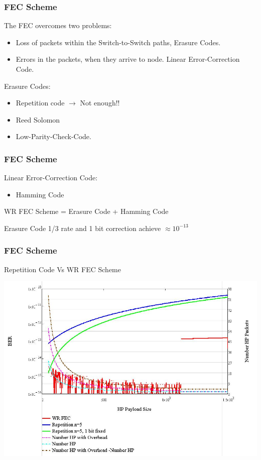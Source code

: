 \documentclass[]{beamer}
\begin{document}
\begin{frame}
\frametitle{FEC Scheme}
The FEC overcomes two problems:
\begin{itemize}
	\item Loss of packets within the Switch-to-Switch paths, Erasure Codes.
	\item Errors in the packets, when they arrive to node. Linear Error-Correction Code.
\end{itemize}


Erasure Codes: 
\begin{itemize}
	\item Repetition code $\rightarrow$ Not enough!! 
	\item Reed Solomon 
	\item Low-Parity-Check-Code.
\end{itemize}
\end{frame}

\begin{frame}
\frametitle{FEC Scheme}
Linear Error-Correction Code:
\begin{itemize}
	\item Hamming Code
\end{itemize}

\vspace{0.5cm}
\begin{center}
WR FEC Scheme = Erasure Code + Hamming Code

Erasure Code  1/3 rate and 1 bit correction achieve $\approx 10^{-13}$   

\end{center}
\end{frame}




\begin{frame}
\frametitle{FEC Scheme}
Repetition Code Vs WR FEC Scheme
\begin{center}

  \includegraphics[scale=0.35]{robustness/biterror}



\end{center}
\end{frame}
\end{document}
